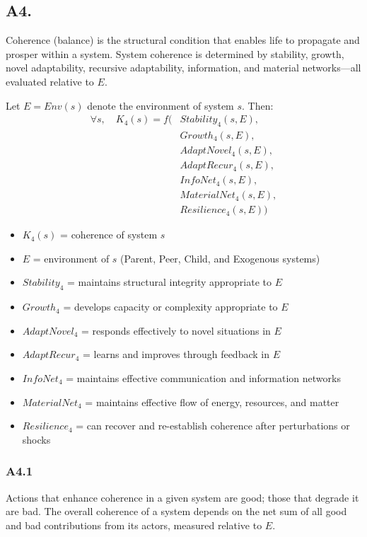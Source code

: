 \documentclass[11pt]{article}
\begin{document}
\subsection*{A4.}
Coherence (balance) is the structural condition that enables life to propagate and prosper within a system. 
System coherence is determined by stability, growth, novel adaptability, recursive adaptability, 
information, and material networks—all evaluated relative to $E$.

Let $E = Env(s)$ denote the environment of system $s$. Then:
\[
\begin{aligned}
\forall s,\quad K_4(s) = f(&
  Stability_4(s, E),\\
  &Growth_4(s, E),\\
  &AdaptNovel_4(s, E),\\
  &AdaptRecur_4(s, E),\\
  &InfoNet_4(s, E),\\
  &MaterialNet_4(s, E),\\
  &Resilience_4(s, E)
)
\end{aligned}
\]

\begin{itemize}
\item $K_4(s)$ = coherence of system $s$
\item $E$ = environment of $s$ (Parent, Peer, Child, and Exogenous systems)
\item $Stability_4$ = maintains structural integrity appropriate to $E$
\item $Growth_4$ = develops capacity or complexity appropriate to $E$
\item $AdaptNovel_4$ = responds effectively to novel situations in $E$
\item $AdaptRecur_4$ = learns and improves through feedback in $E$
\item $InfoNet_4$ = maintains effective communication and information networks
\item $MaterialNet_4$ = maintains effective flow of energy, resources, and matter
\item $Resilience_4$ = can recover and re-establish coherence after perturbations or shocks
\end{itemize}

\subsubsection*{A4.1}
Actions that enhance coherence in a given system are good; those that degrade it are bad. 
The overall coherence of a system depends on the net sum of all good and bad contributions from its actors, 
measured relative to $E$.
\end{document}
